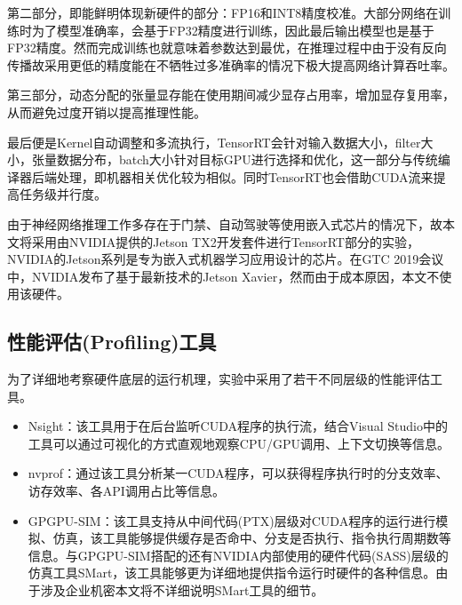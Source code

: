 \par 第二部分，即能鲜明体现新硬件的部分：FP16和INT8精度校准。大部分网络在训练时为了模型准确率，会基于FP32精度进行训练，因此最后输出模型也是基于FP32精度。然而完成训练也就意味着参数达到最优，在推理过程中由于没有反向传播故采用更低的精度能在不牺牲过多准确率的情况下极大提高网络计算吞吐率。
\par 第三部分，动态分配的张量显存能在使用期间减少显存占用率，增加显存复用率，从而避免过度开销以提高推理性能。
\par 最后便是Kernel自动调整和多流执行，TensorRT会针对输入数据大小，filter大小，张量数据分布，batch大小针对目标GPU进行选择和优化，这一部分与传统编译器后端处理，即机器相关优化较为相似。同时TensorRT也会借助CUDA流来提高任务级并行度。
\par 由于神经网络推理工作多存在于门禁、自动驾驶等使用嵌入式芯片的情况下，故本文将采用由NVIDIA提供的Jetson TX2开发套件进行TensorRT部分的实验，NVIDIA的Jetson系列是专为嵌入式机器学习应用设计的芯片\cite{TENSORRTDOC}。在GTC 2019会议中，NVIDIA发布了基于最新技术的Jetson Xavier，然而由于成本原因，本文不使用该硬件。

\subsection{性能评估(Profiling)工具}
\par 为了详细地考察硬件底层的运行机理，实验中采用了若干不同层级的性能评估工具。
\begin{itemize}
	\item Nsight：该工具用于在后台监听CUDA程序的执行流，结合Visual Studio中的工具可以通过可视化的方式直观地观察CPU/GPU调用、上下文切换等信息\cite{NSIGHT}。
	\item nvprof：通过该工具分析某一CUDA程序，可以获得程序执行时的分支效率、访存效率、各API调用占比等信息\cite{NVPROF}。
	\item GPGPU-SIM：该工具支持从中间代码(PTX)层级对CUDA程序的运行进行模拟、仿真，该工具能够提供缓存是否命中、分支是否执行、指令执行周期数等信息\cite{GPGPUSIM}。与GPGPU-SIM搭配的还有NVIDIA内部使用的硬件代码(SASS)层级的仿真工具SMart，该工具能够更为详细地提供指令运行时硬件的各种信息。由于涉及企业机密本文将不详细说明SMart工具的细节。
\end{itemize}
